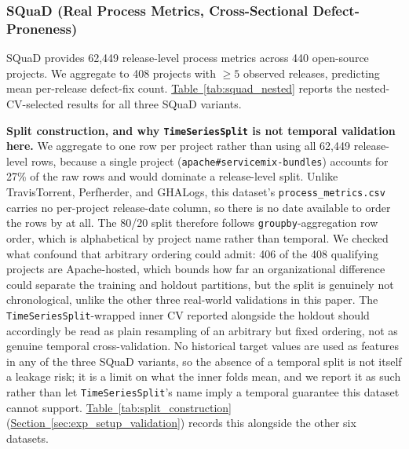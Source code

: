 \documentclass[technologies,article,submit,pdftex,moreauthors]{Definitions/mdpi}
\begin{document}
\subsubsection{SQuaD (Real Process Metrics, Cross-Sectional Defect-Proneness)}\label{sec:squad}

SQuaD \citep{squad2025} provides 62,449 release-level process metrics across 440 open-source projects. We aggregate to 408 projects with \(\geq 5\) observed releases, predicting mean per-release defect-fix count. \hyperref[tab:squad_nested]{Table~\ref*{tab:squad_nested}} reports the nested-CV-selected results for all three SQuaD variants.

\textbf{Split construction, and why \texttt{TimeSeriesSplit} is not temporal validation here.} We aggregate to one row per project rather than using all 62,449 release-level rows, because a single project (\texttt{apache\#servicemix-bundles}) accounts for 27\% of the raw rows and would dominate a release-level split. Unlike TravisTorrent, Perfherder, and GHALogs, this dataset's \texttt{process\_metrics.csv} carries no per-project release-date column, so there is no date available to order the rows by at all. The 80/20 split therefore follows \texttt{groupby}-aggregation row order, which is alphabetical by project name rather than temporal. We checked what confound that arbitrary ordering could admit: 406 of the 408 qualifying projects are Apache-hosted, which bounds how far an organizational difference could separate the training and holdout partitions, but the split is genuinely not chronological, unlike the other three real-world validations in this paper. The \texttt{TimeSeriesSplit}-wrapped inner CV reported alongside the holdout should accordingly be read as plain resampling of an arbitrary but fixed ordering, not as genuine temporal cross-validation. No historical target values are used as features in any of the three SQuaD variants, so the absence of a temporal split is not itself a leakage risk; it is a limit on what the inner folds mean, and we report it as such rather than let \texttt{TimeSeriesSplit}'s name imply a temporal guarantee this dataset cannot support. \hyperref[tab:split_construction]{Table~\ref*{tab:split_construction}} (\hyperref[sec:exp_setup_validation]{Section~\ref*{sec:exp_setup_validation}}) records this alongside the other six datasets.
\end{document}
